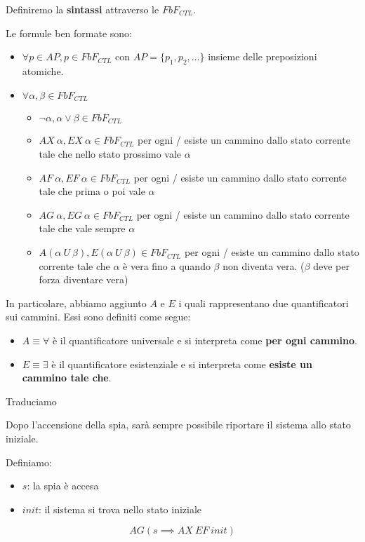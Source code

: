 Definiremo la \textbf{sintassi} attraverso le $FbF_{CTL}$.
\begin{definizione}
    Le formule ben formate sono:
    \begin{itemize}
        \item $\forall p \in AP, p\in FbF_{CTL}$ con $AP = \{p_1,p_2,\dots\}$
              insieme delle preposizioni atomiche.
        \item $\forall \alpha, \beta \in FbF_{CTL}$
              \begin{itemize}
                  \item $\lnot\alpha, \alpha \lor \beta \in FbF_{CTL}$
                  \item $AX \ \alpha, EX \ \alpha \in FbF_{CTL}$ per ogni / esiste
                        un cammino dallo stato corrente tale che nello stato prossimo
                        vale $\alpha$
                  \item $AF \ \alpha, EF \ \alpha \in FbF_{CTL}$ per ogni / esiste
                        un cammino dallo stato corrente tale che prima o poi vale $\alpha$
                  \item $AG \ \alpha, EG \ \alpha \in FbF_{CTL}$ per ogni / esiste
                        un cammino dallo stato corrente tale che vale sempre $\alpha$
                  \item $A(\alpha \ U \ \beta), E(\alpha \ U \ \beta)\in FbF_{CTL}$
                        per ogni / esiste un cammino dallo stato corrente tale che
                        $\alpha$ è vera fino a quando $\beta$ non diventa vera.
                        ($\beta$ deve per forza diventare vera)
              \end{itemize}
    \end{itemize}

\end{definizione}
In particolare, abbiamo aggiunto $A$ e $E$ i quali rappresentano due quantificatori
sui cammini. Essi sono definiti come segue:
\begin{itemize}
    \item $A\equiv \forall$ è il quantificatore universale e si interpreta come
          \textbf{per ogni cammino}.
    \item $E\equiv \exists$ è il quantificatore esistenziale e si interpreta come
          \textbf{esiste un cammino tale che}.
\end{itemize}
\begin{esempio}
    Traduciamo
    \begin{center}
        Dopo l'accensione della spia, sarà sempre possibile riportare il sistema
        allo stato iniziale.
    \end{center}
    Definiamo:
    \begin{itemize}
        \item $s$: la spia è accesa
        \item $init$: il sistema si trova nello stato iniziale
    \end{itemize}
    \begin{equation}
        AG(s\implies AX \ EF \ init)
    \end{equation}
\end{esempio}
